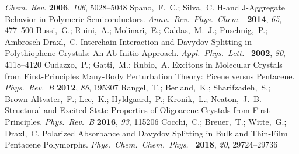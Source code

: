 \documentclass[journal=jpclcd,manuscript=letter]{achemso}
\begin{document}
\begin{mcitethebibliography}{51}
  \emph{Chem. Rev.} \textbf{2006}, \emph{106}, 5028--5048\relax
\mciteBstWouldAddEndPuncttrue
\mciteSetBstMidEndSepPunct{\mcitedefaultmidpunct}
{\mcitedefaultendpunct}{\mcitedefaultseppunct}\relax
\EndOfBibitem
{}
Spano,~F.~C.; Silva,~C. H-and J-Aggregate Behavior in Polymeric Semiconductors.
  \emph{Annu.~Rev.~Phys.~Chem.~} \textbf{2014}, \emph{65}, 477--500\relax
\mciteBstWouldAddEndPuncttrue
\mciteSetBstMidEndSepPunct{\mcitedefaultmidpunct}
{\mcitedefaultendpunct}{\mcitedefaultseppunct}\relax
\EndOfBibitem
{}
Bussi,~G.; Ruini,~A.; Molinari,~E.; Caldas,~M.~J.; Puschnig,~P.;
  Ambrosch-Draxl,~C. Interchain Interaction and Davydov Splitting in
  Polythiophene Crystals: An Ab Initio Approach. \emph{Appl.~Phys.~Lett.~}
  \textbf{2002}, \emph{80}, 4118--4120\relax
\mciteBstWouldAddEndPuncttrue
\mciteSetBstMidEndSepPunct{\mcitedefaultmidpunct}
{\mcitedefaultendpunct}{\mcitedefaultseppunct}\relax
\EndOfBibitem
{}
Cudazzo,~P.; Gatti,~M.; Rubio,~A. Excitons in Molecular Crystals from
  First-Principles Many-Body Perturbation Theory: Picene versus Pentacene.
  \emph{Phys.~Rev.~B} \textbf{2012}, \emph{86}, 195307\relax
\mciteBstWouldAddEndPuncttrue
\mciteSetBstMidEndSepPunct{\mcitedefaultmidpunct}
{\mcitedefaultendpunct}{\mcitedefaultseppunct}\relax
\EndOfBibitem
{}
Rangel,~T.; Berland,~K.; Sharifzadeh,~S.; Brown-Altvater,~F.; Lee,~K.;
  Hyldgaard,~P.; Kronik,~L.; Neaton,~J.~B. Structural and Excited-State
  Properties of Oligoacene Crystals from First Principles. \emph{Phys.~Rev.~B}
  \textbf{2016}, \emph{93}, 115206\relax
\mciteBstWouldAddEndPuncttrue
\mciteSetBstMidEndSepPunct{\mcitedefaultmidpunct}
{\mcitedefaultendpunct}{\mcitedefaultseppunct}\relax
\EndOfBibitem
{}
Cocchi,~C.; Breuer,~T.; Witte,~G.; Draxl,~C. Polarized Absorbance and Davydov
  Splitting in Bulk and Thin-Film Pentacene Polymorphs.
  \emph{Phys.~Chem.~Chem.~Phys.~} \textbf{2018}, \emph{20}, 29724--29736\relax
\mciteBstWouldAddEndPuncttrue
\mciteSetBstMidEndSepPunct{\mcitedefaultmidpunct}
{\mcitedefaultendpunct}{\mcitedefaultseppunct}\relax
\EndOfBibitem
{}

\end{mcitethebibliography}
\end{document}
